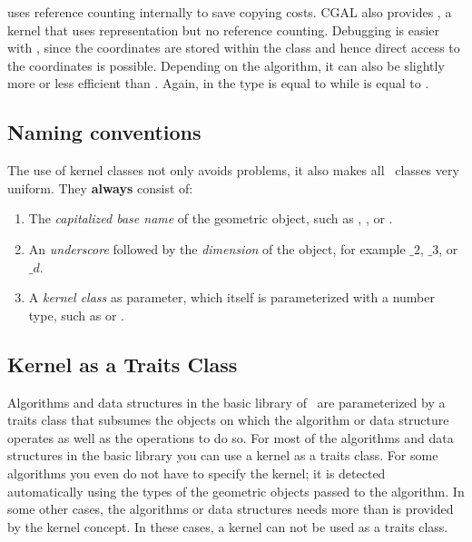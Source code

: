  uses reference counting internally
to save copying costs. CGAL also provides
, a kernel that uses
 representation but no reference
counting. Debugging is easier with
, since the coordinates are
stored within the class and hence direct access to the coordinates is
possible. Depending on the algorithm, it can also be slightly more or
less efficient than . Again, in
 the type
 is equal to
 while
 is equal to
.

\subsection{Naming conventions}

The use of kernel classes not only avoids problems, it also makes all
\cgal\ classes very uniform. They {\bf always} consist of:
\begin{enumerate}
\begin{ccTexOnly}
\itemsep0pt\parskip0pt
\end{ccTexOnly}

\item The {\em capitalized base name} of the geometric object, such as 
      , , or .

\item An {\em underscore} followed by the {\em dimension} of the object, 
      for example $\_2$, $\_3$, or $\_d$.
      
    \item A {\em kernel class} as parameter, which itself is
      parameterized with a number type, such as
       or
      .
\end{enumerate}

\subsection{Kernel as a Traits Class}
Algorithms and data structures in the basic library of \cgal\ are
parameterized by a traits class that subsumes the objects on which the
algorithm or data structure operates as well as the operations to do
so. For most of the algorithms and data structures in the basic
library you can use a kernel as a traits class. For some algorithms
you even do not have to specify the kernel; it is detected
automatically using the types of the geometric objects passed to the
algorithm. In some other cases, the algorithms or data structures
needs more than is provided by the kernel concept. In these cases, a
kernel can not be used as a traits class.

